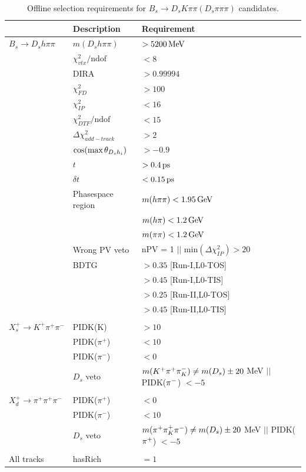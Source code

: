 \begin{table}[h]
\centering
\caption{Offline selection requirements for $B_s\to D_s K \pi\pi (D_s \pi\pi\pi)$ candidates.}
 \renewcommand{\arraystretch}{1.}
 \small
 \begin{tabular}{l l l}
\hline
\hline
 & Description & Requirement  \\
\hline
$B_s \to D_s h \pi \pi$  & $m(D_s h \pi \pi)$ & $> 5200 \mathrm{\,Me\kern -0.1em V}$ \\
&  $\chi^{2}_{vtx}/\text{ndof}  $&$ <  8$ \\
& DIRA &$ > 0.99994$ \\
& $\chi^{2}_{FD}$ & $> 100$ \\
& $\chi^{2}_{IP}$ & $< 16$ \\
&  $\chi^{2}_{DTF}/\text{ndof} $&$   <  15 $ \\
&  $\Delta\chi^{2}_{add-track} $&$   >  2 $ \\
& $\cos(\text{max} \, \theta_{{{D}_{s}} h_{i}})$ &$   > -0.9 $ \\
& $t$  & $ > 0.4 {\mathrm{ \,ps}}$ \\
& $\delta t$  & $ < 0.15 {\mathrm{ \,ps}}$ \\
& Phasespace region & $m(h\pi\pi) < 1.95 \mathrm{\,Ge\kern -0.1em V}$ \\ & & $m(h\pi) < 1.2 \mathrm{\,Ge\kern -0.1em V}$ \\ & & $m(\pi\pi) < 1.2 \mathrm{\,Ge\kern -0.1em V}$ \\
& Wrong PV veto & nPV = 1 $||$  $\text{min}(\Delta\chi^{2}_{IP}) > 20$ \\
& BDTG &  $> 0.35$ [Run-I,\textsf{L0-TOS}] \\
& & $> 0.45$ [Run-I,\textsf{L0-TIS}] \\
& & $> 0.25$ [Run-II,\textsf{L0-TOS}] \\
& & $> 0.45$ [Run-II,\textsf{L0-TIS}] \\
\\
$X_s^+ \to K^+ \pi^+ \pi^-$  & PIDK(K) & $> 10$ \\
& PIDK($\pi^+$) & $< 10$ \\
& PIDK($\pi^-$) & $< 0$ \\
& $D_s$ veto & $m({{K}^+} {{\pi}^+} \pi^-_K) \ne m(D_s) \pm 20$ MeV $||$ PIDK(${{\pi}^-}$) $< -5$ \\
\\
$X_d^+ \to \pi^+ \pi^+ \pi^-$  & PIDK($\pi^+$) & $< 0$ \\
& PIDK($\pi^-$) & $< 10$ \\
& $D_s$ veto & $m({{\pi}^+} \pi^+_K {{\pi}^-}) \ne m(D_s) \pm 20$ MeV $||$ PIDK(${{\pi}^+}$) $< -5$ \\
\\
All tracks & hasRich & $= 1$ \\

\hline
\hline
\end{tabular}
\label{table:selBs}
\end{table}


